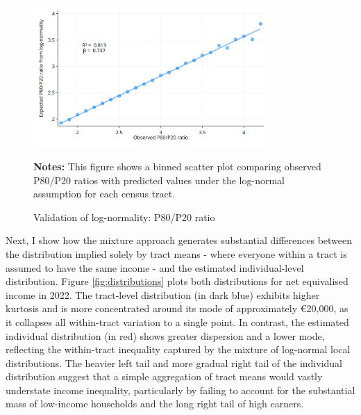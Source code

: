 \begin{figure}[H]
\begin{center}
\captionsetup{justification=centering}
\caption{Validation of log-normality: P80/P20 ratio}
\label{fig:p80p20}
\includegraphics[width=0.8\textwidth]{output/binned_scatter_p80p20.png}
\end{center}
\begin{fignotes2}
\textbf{Notes:} This figure shows a binned scatter plot comparing observed P80/P20 ratios with predicted values under the log-normal assumption for each census tract.
\end{fignotes2}
\end{figure}

Next, I show how the mixture approach generates substantial differences between the distribution implied solely by tract means - where everyone within a tract is assumed to have the same income - and the estimated individual-level distribution. Figure \ref{fig:distributions} plots both distributions for net equivalised income in 2022. The tract-level distribution (in dark blue) exhibits higher kurtosis and is more concentrated around its mode of approximately €20,000, as it collapses all within-tract variation to a single point. In contrast, the estimated individual distribution (in red) shows greater dispersion and a lower mode, reflecting the within-tract inequality captured by the mixture of log-normal local distributions. The heavier left tail and more gradual right tail of the individual distribution suggest that a simple aggregation of tract means would vastly understate income inequality, particularly by failing to account for the substantial mass of low-income households and the long right tail of high earners.

